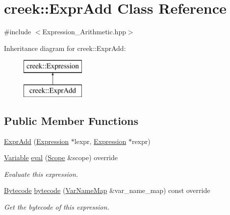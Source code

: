 \hypertarget{classcreek_1_1_expr_add}{}\section{creek\+:\+:Expr\+Add Class Reference}
\label{classcreek_1_1_expr_add}


{\ttfamily \#include $<$Expression\+\_\+\+Arithmetic.\+hpp$>$}

Inheritance diagram for creek\+:\+:Expr\+Add\+:\begin{figure}[H]
\begin{center}
\leavevmode
\includegraphics[height=2.000000cm]{classcreek_1_1_expr_add}
\end{center}
\end{figure}
\subsection*{Public Member Functions}
\begin{DoxyCompactItemize}
\item 
\hyperlink{classcreek_1_1_expr_add_a070fcf99662262eb922a6f4c8f3cc829}{Expr\+Add} (\hyperlink{classcreek_1_1_expression}{Expression} $\ast$lexpr, \hyperlink{classcreek_1_1_expression}{Expression} $\ast$rexpr)
\item 
\hyperlink{classcreek_1_1_variable}{Variable} \hyperlink{classcreek_1_1_expr_add_a3d8ff369c865a75ff359adb85afc423f}{eval} (\hyperlink{classcreek_1_1_scope}{Scope} \&scope) override
\begin{DoxyCompactList}\small\item\em Evaluate this expression. \end{DoxyCompactList}\item 
\hyperlink{classcreek_1_1_bytecode}{Bytecode} \hyperlink{classcreek_1_1_expr_add_af9cffda13dcc68a5fcc23008f35ffa05}{bytecode} (\hyperlink{classcreek_1_1_var_name_map}{Var\+Name\+Map} \&var\+\_\+name\+\_\+map) const  override\hypertarget{classcreek_1_1_expr_add_af9cffda13dcc68a5fcc23008f35ffa05}{}\label{classcreek_1_1_expr_add_af9cffda13dcc68a5fcc23008f35ffa05}

\begin{DoxyCompactList}\small\item\em Get the bytecode of this expression. \end{DoxyCompactList}\end{DoxyCompactItemize}


